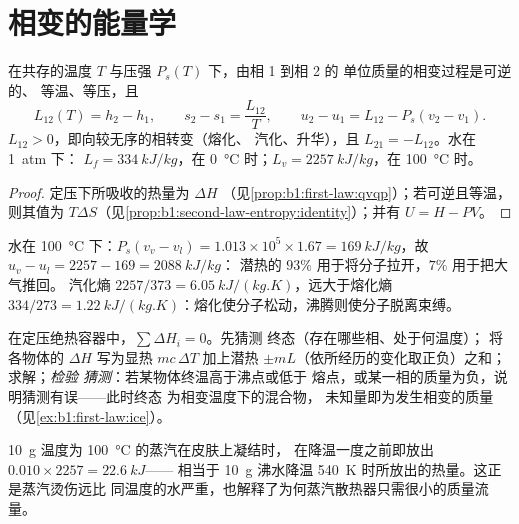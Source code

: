 \section{相变的能量学}

\begin{proposition}\label{prop:b1:phase-changes:latent}
在共存的温度 $T$ 与压强 $P_s(T)$ 下，由相 1 到相 2 的
单位质量的相变过程是可逆的、
等温、等压，且
\[
L_{12}(T) = h_2 - h_1 , \qquad s_2 - s_1 = \frac{L_{12}}{T} , \qquad
u_2 - u_1 = L_{12} - P_s(v_2 - v_1) .
\]
$L_{12} > 0$，即向较无序的相转变（熔化、
汽化、升华），且 $L_{21} = -L_{12}$。水在 \qty{1}{atm} 下：
$L_f = \qty{334}{kJ/kg}$，在 \qty{0}{\degreeCelsius} 时；$L_v = \qty{2257}{kJ/kg}$，在
\qty{100}{\degreeCelsius} 时。
\end{proposition}

\begin{proof}
定压下所吸收的热量为 $\Delta H$
（见\cref{prop:b1:first-law:qvqp}）；若可逆且等温，则其值为
$T\Delta S$（见\cref{prop:b1:second-law-entropy:identity}）；并有 $U = H - PV$。
\end{proof}

\begin{example}[汽化热的去向]\label{ex:b1:phase-changes:whereheat}
水在 \qty{100}{\degreeCelsius} 下：$P_s(v_v - v_l) = 1.013 \times 10^5 \times
1.67 = \qty{169}{kJ/kg}$，故 $u_v - u_l = 2257 - 169 = \qty{2088}{kJ/kg}$：
潜热的 $93\%$ 用于将分子拉开，$7\%$
用于把大气推回。
汽化熵 $2257/373 = \qty{6.05}{kJ/(kg.K)}$，远大于熔化熵 $334/273 =
\qty{1.22}{kJ/(kg.K)}$：熔化使分子松动，沸腾则使分子脱离束缚。
\end{example}

\begin{method}[含相变的量热法]\label{meth:b1:phase-changes:calorimetry}
在定压绝热容器中，$\sum\Delta H_i = 0$。先猜测
终态（存在哪些相、处于何温度）；
将各物体的 $\Delta H$ 写为显热 $mc\,\Delta T$ 加上潜热
$\pm mL$（依所经历的变化取正负）之和；求解；\emph{检验
猜测}：若某物体终温高于沸点或低于
熔点，或某一相的质量为负，说明猜测有误——此时终态
为相变温度下的混合物，
未知量即为发生相变的质量（见\cref{ex:b1:first-law:ice}）。
\end{method}

\begin{example}[蒸汽烫伤]\label{ex:b1:phase-changes:steam}
\qty{10}{g} 温度为 \qty{100}{\degreeCelsius} 的蒸汽在皮肤上凝结时，
在降温一度之前即放出 $0.010 \times 2257 = \qty{22.6}{kJ}$——
相当于 \qty{10}{g} 沸水降温
\qty{540}{K} 时所放出的热量。这正是蒸汽烫伤远比
同温度的水严重，也解释了为何蒸汽散热器只需很小的质量流量。
\end{example}

